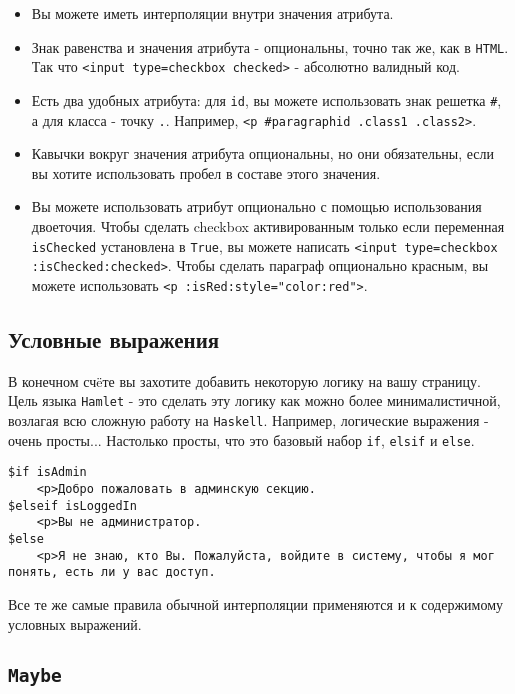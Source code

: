 \begin{itemize}
\item Вы можете иметь интерполяции внутри значения атрибута.
\item Знак равенства и значения атрибута - опциональны, точно так же, как в \texttt{HTML}.
Так что \lstinline!<input type=checkbox checked>! - абсолютно валидный код.
\item Есть два удобных атрибута: для \lstinline!id!, вы можете использовать знак
решетка \texttt{\#}, а для класса - точку \texttt{.}. Например, \lstinline!<p #paragraphid .class1 .class2>!.
\item Кавычки вокруг значения атрибута опциональны, но они обязательны, если вы
хотите использовать пробел в составе этого значения.
\item Вы можете использовать атрибут опционально с помощью использования двоеточия.
Чтобы сделать checkbox активированным только если переменная \lstinline!isChecked!
установлена в \lstinline!True!, вы можете написать
\lstinline!<input type=checkbox :isChecked:checked>!.
Чтобы сделать параграф опционально красным, вы можете использовать
\lstinline!<p :isRed:style="color:red">!.
\end{itemize}


\subsection{Условные выражения}

В конечном счëте вы захотите добавить некоторую логику на вашу страницу. Цель
языка \texttt{Hamlet} - это сделать эту логику как можно более минималистичной, возлагая
всю сложную работу на \texttt{Haskell}. Например, логические выражения - очень просты...
Настолько просты, что это базовый набор \texttt{if}, \texttt{elsif} и
\texttt{else}.

\begin{lstlisting}
$if isAdmin
    <p>Добро пожаловать в админскую секцию.
$elseif isLoggedIn
    <p>Вы не администратор.
$else
    <p>Я не знаю, кто Вы. Пожалуйста, войдите в систему, чтобы я мог понять, есть ли у вас доступ.
\end{lstlisting}

Все те же самые правила обычной интерполяции применяются и к содержимому
условных выражений.

\subsection{\lstinline!Maybe!}

